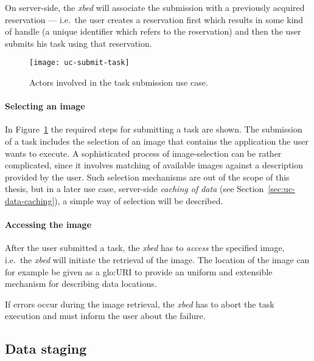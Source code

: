 On  server-side, the  \emph{xbed}  will associate  the  submission with  a
previously acquired  reservation ---  i.e.~the user creates  a reservation
first  which results in  some kind  of handle  (a unique  identifier which
refers to the  reservation) and then the user submits  his task using that
reservation.

\begin{figure}[htbp]
  \begin{center}
    \texttt{[image: uc-submit-task]}
  \end{center}
  \caption[UC Task submission]{Actors involved  in the task submission use
    case.}
  \label{fig:uc-submit-task}
\end{figure}

\paragraph{Selecting an image}
In  Figure~\ref{fig:uc-submit-task} the  required steps  for  submitting a
task are  shown. The  submission of  a task includes  the selection  of an
image  that  contains  the  application  the user  wants  to  execute.   A
sophisticated process of image-selection  can be rather complicated, since
it involves matching of available images against a description provided by
the user. Such  selection mechanisms are out of the  scope of this thesis,
but  in  a  later  use  case,  server-side  \emph{caching  of  data}  (see
Section~\ref{sec:uc-data-caching}),  a  simple way  of  selection will  be
described.

\paragraph{Accessing the image}
After the user submitted a  task, the \emph{xbed} has to \emph{access} the
specified image,  i.e.~the \emph{xbed} will initiate the  retrieval of the
image.   The  location  of  the  image  can for  example  be  given  as  a
\gls{glo:URI}  to   provide  an  uniform  and   extensible  mechanism  for
describing data locations.

If errors occur  during the image retrieval, the  \emph{xbed} has to abort
the task execution and must inform the user about the failure.

\subsection{Data staging}
\label{sec:uc-data-staging}

